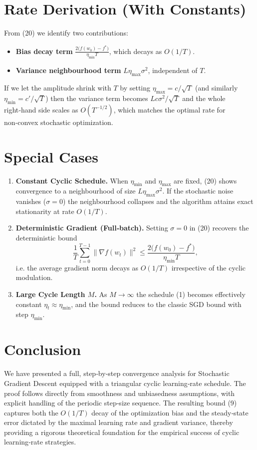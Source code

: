\documentclass{article}
\begin{document}
\section*{Rate Derivation (With Constants)}
From (20) we identify two contributions:
\begin{itemize}
\item \textbf{Bias decay term} $ \displaystyle \frac{2\big(f(w_{0})-f^{*}\big)}{\eta_{\min}T}$, which decays as $O(1/T)$.
\item \textbf{Variance neighbourhood term} $L\eta_{\max}\sigma^{2}$, independent of $T$.
\end{itemize}
If we let the amplitude shrink with $T$ by setting $\eta_{\max}=c/\sqrt{T}$ (and similarly $\eta_{\min}=c'/\sqrt{T}$) then the variance term becomes $L c\sigma^{2}/\sqrt{T}$ and the whole right‑hand side scales as $O(T^{-1/2})$, which matches the optimal rate for non‑convex stochastic optimization.

\section*{Special Cases}
\begin{enumerate}
\item \textbf{Constant Cyclic Schedule.} When $\eta_{\min}$ and $\eta_{\max}$ are fixed, (20) shows convergence to a neighbourhood of size $L\eta_{\max}\sigma^{2}$. If the stochastic noise vanishes ($\sigma=0$) the neighbourhood collapses and the algorithm attains exact stationarity at rate $O(1/T)$.
\item \textbf{Deterministic Gradient (Full‑batch).} Setting $\sigma=0$ in (20) recovers the deterministic bound
\[
\frac{1}{T}\sum_{t=0}^{T-1}\|\nabla f(w_t)\|^{2}
\le \frac{2\big(f(w_{0})-f^{*}\big)}{\eta_{\min}T},
\]
i.e. the average gradient norm decays as $O(1/T)$ irrespective of the cyclic modulation.
\item \textbf{Large Cycle Length $M$.} As $M\to\infty$ the schedule (1) becomes effectively constant $\eta_t\approx\eta_{\min}$, and the bound reduces to the classic SGD bound with step $\eta_{\min}$.
\end{enumerate}

\section*{Conclusion}
We have presented a full, step‑by‑step convergence analysis for Stochastic Gradient Descent equipped with a triangular cyclic learning‑rate schedule. The proof follows directly from smoothness and unbiasedness assumptions, with explicit handling of the periodic step‑size sequence. The resulting bound (9) captures both the $O(1/T)$ decay of the optimization bias and the steady‑state error dictated by the maximal learning rate and gradient variance, thereby providing a rigorous theoretical foundation for the empirical success of cyclic learning‑rate strategies.
\end{document}
